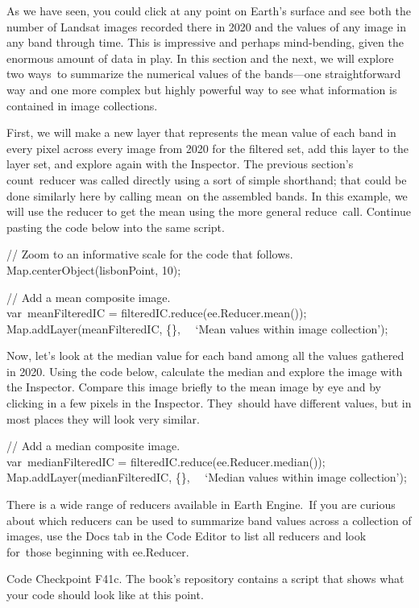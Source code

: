 \documentclass[
  letterpaper,
  DIV=11,
  numbers=noendperiod]{scrreprt}
\begin{document}
As we have seen, you could click at any point on Earth's surface and see
both the number of Landsat images recorded there in 2020 and the values
of any image in any band through time. This is impressive and perhaps
mind-bending, given the enormous amount of data in play. In this section
and the next, we will explore two ways~to summarize the numerical values
of the bands---one straightforward way and one more complex but highly
powerful way to see what information is contained in image collections.

First, we will make a new layer that represents the mean value of each
band in every pixel across every image from 2020 for the filtered set,
add this layer to the layer set, and explore again with the Inspector.
The previous section's count~reducer was called directly using a sort of
simple shorthand; that could be done similarly here by calling mean~on
the assembled bands. In this example, we will use the reducer to get the
mean using the more general reduce~call. Continue pasting the code below
into the same script.

// Zoom to an informative scale for the code that follows.\\
Map.centerObject(lisbonPoint, 10);

// Add a mean composite image.\\
var~meanFilteredIC = filteredIC.reduce(ee.Reducer.mean());\\
Map.addLayer(meanFilteredIC, \{\},~ ~`Mean values within image
collection');

Now, let's look at the median value for each band among all the values
gathered in 2020. Using the code below, calculate the median and explore
the image with the Inspector. Compare this image briefly to the mean
image by eye and by clicking in a few pixels in the Inspector.
They~should have different values, but in most places they will look
very similar.

// Add a median composite image.\\
var~medianFilteredIC = filteredIC.reduce(ee.Reducer.median());\\
Map.addLayer(medianFilteredIC, \{\},~ ~`Median values within image
collection');

There is a wide range of reducers available in Earth Engine.~If you are
curious about which reducers can be used to summarize band values across
a collection of images, use the Docs tab in the Code Editor to list all
reducers and look for~those beginning with ee.Reducer.

\begin{tcolorbox}[enhanced jigsaw, left=2mm, breakable, rightrule=.15mm, opacityback=0, colframe=quarto-callout-note-color-frame, colbacktitle=quarto-callout-note-color!10!white, arc=.35mm, opacitybacktitle=0.6, toptitle=1mm, colback=white, leftrule=.75mm, title=\textcolor{quarto-callout-note-color}{\faInfo}\hspace{0.5em}{Note}, toprule=.15mm, bottomtitle=1mm, titlerule=0mm, bottomrule=.15mm, coltitle=black]

Code Checkpoint F41c. The book's repository contains a script that shows
what your code should look like at this point.

\end{tcolorbox}
\end{document}
